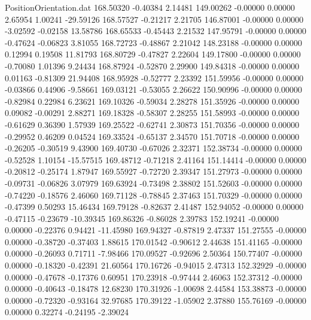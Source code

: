 \begin{filecontents}{PositionOrientation.dat}
 168.50320   -0.40384    2.14481   149.00262   -0.00000    0.00000    2.65954    1.00241  -29.59126
 168.57527   -0.21217    2.21705   146.87001   -0.00000    0.00000   -3.02592   -0.02158   13.58786
 168.65533   -0.45443    2.21532   147.95791   -0.00000    0.00000   -0.47624   -0.06823    3.81055
 168.72723   -0.48867    2.21042   148.23188   -0.00000    0.00000    0.12994    0.19508   11.81793
 168.80729   -0.47827    2.22604   149.17800   -0.00000    0.00000   -0.70080    1.01396    9.24434
 168.87924   -0.52870    2.29900   149.84318   -0.00000    0.00000    0.01163   -0.81309   21.94408
 168.95928   -0.52777    2.23392   151.59956   -0.00000    0.00000   -0.03866    0.44906   -9.58661
 169.03121   -0.53055    2.26622   150.90996   -0.00000    0.00000   -0.82984    0.22984    6.23621
 169.10326   -0.59034    2.28278   151.35926   -0.00000    0.00000    0.09082   -0.00291    2.88271
 169.18328   -0.58307    2.28255   151.58993   -0.00000    0.00000   -0.61629    0.36390    1.57939
 169.25522   -0.62741    2.30873   151.70356   -0.00000    0.00000   -0.29952    0.46209    0.04524
 169.33524   -0.65137    2.34570   151.70718   -0.00000    0.00000   -0.26205   -0.30519    9.43900
 169.40730   -0.67026    2.32371   152.38734   -0.00000    0.00000   -0.52528    1.10154  -15.57515
 169.48712   -0.71218    2.41164   151.14414   -0.00000    0.00000   -0.20812   -0.25174    1.87947
 169.55927   -0.72720    2.39347   151.27973   -0.00000    0.00000   -0.09731   -0.06826    3.07979
 169.63924   -0.73498    2.38802   151.52603   -0.00000    0.00000   -0.74220   -0.18576    2.46060
 169.71128   -0.78845    2.37463   151.70329   -0.00000    0.00000   -0.47399    0.50293   15.46434
 169.79128   -0.82637    2.41487   152.94052   -0.00000    0.00000   -0.47115   -0.23679  -10.39345
 169.86326   -0.86028    2.39783   152.19241   -0.00000    0.00000   -0.22376    0.94421  -11.45980
 169.94327   -0.87819    2.47337   151.27555   -0.00000    0.00000   -0.38720   -0.37403    1.88615
 170.01542   -0.90612    2.44638   151.41165   -0.00000    0.00000   -0.26093    0.71711   -7.98466
 170.09527   -0.92696    2.50364   150.77407   -0.00000    0.00000   -0.18320   -0.42391   21.60564
 170.16726   -0.94015    2.47313   152.32929   -0.00000    0.00000   -0.47678   -0.17376    0.60951
 170.23918   -0.97444    2.46063   152.37312   -0.00000    0.00000   -0.40643   -0.18478   12.68230
 170.31926   -1.00698    2.44584   153.38873   -0.00000    0.00000   -0.72320   -0.93164   32.97685
 170.39122   -1.05902    2.37880   155.76169   -0.00000    0.00000    0.32274   -0.24195   -2.39024

\end{filecontents}
